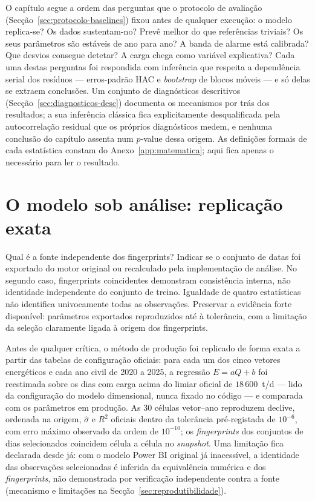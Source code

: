 O capítulo segue a ordem das perguntas que o protocolo de avaliação
(Secção~\ref{sec:protocolo-baselines}) fixou antes de qualquer execução:
o modelo replica-se? Os dados sustentam-no? Prevê melhor do que referências
triviais? Os seus parâmetros são estáveis de ano para ano? A banda de alarme
está calibrada? Que desvios consegue detetar? A carga chega como variável
explicativa? Cada uma destas perguntas foi respondida com inferência que
respeita a dependência serial dos resíduos --- erros-padrão HAC e
\emph{bootstrap} de blocos móveis --- e só delas se extraem conclusões. Um
conjunto de diagnósticos descritivos (Secção~\ref{sec:diagnosticos-desc})
documenta os mecanismos por trás dos resultados; a sua inferência clássica
fica explicitamente desqualificada pela autocorrelação residual que os
próprios diagnósticos medem, e nenhuma conclusão do capítulo assenta num
$p$-value dessa origem. As definições formais de cada estatística constam do
Anexo~\ref{app:matematica}; aqui fica apenas o necessário para ler o
resultado.

\section{O modelo sob análise: replicação exata}
\label{sec:replicacao}
{Qual é a fonte independente dos fingerprints?}
{Indicar se o conjunto de datas foi exportado do motor original ou
recalculado pela implementação de análise. No segundo caso, fingerprints
coincidentes demonstram consistência interna, não identidade independente
do conjunto de treino. Igualdade de quatro estatísticas não identifica
univocamente todas as observações. Preservar a evidência forte disponível:
parâmetros exportados reproduzidos até à tolerância, com a limitação da
seleção claramente ligada à origem dos fingerprints.}%

Antes de qualquer crítica, o método de produção foi replicado de forma exata a
partir das tabelas de configuração oficiais: para cada um dos cinco vetores
energéticos e cada ano civil de 2020 a 2025, a regressão $E = aQ + b$ foi
reestimada sobre os dias com carga acima do limiar oficial de
$18\,600$~t/d --- lido da configuração do modelo dimensional, nunca fixado no
código --- e comparada com os parâmetros em produção. As 30 células
vetor--ano reproduzem declive, ordenada na origem, $\hat\sigma$ e $R^2$
oficiais dentro da tolerância pré-registada de $10^{-6}$, com erro máximo
observado da ordem de $10^{-10}$; os \emph{fingerprints} dos conjuntos de
dias selecionados coincidem célula a célula no \emph{snapshot}. Uma
limitação fica declarada desde já: com o modelo Power BI original já
inacessível, a identidade das observações selecionadas é inferida da
equivalência numérica e dos \emph{fingerprints}, não demonstrada por
verificação independente contra a fonte
(mecanismo e limitações na Secção~\ref{sec:reprodutibilidade}).

